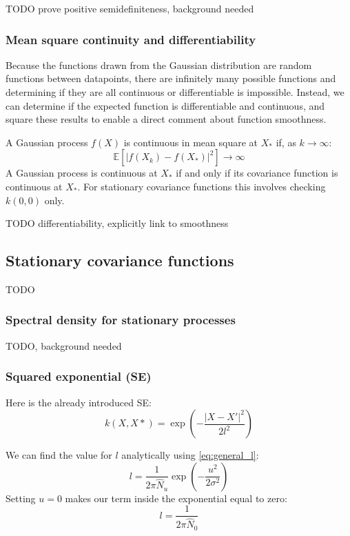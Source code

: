 \documentclass[10pt]{article}
\begin{document}
TODO prove positive semidefiniteness, background needed

\subsubsection{Mean square continuity and differentiability}
Because the functions drawn from the Gaussian distribution are random functions between datapoints, there are infinitely many possible functions and determining if they are all continuous or differentiable is impossible. Instead, we can determine if the expected function is differentiable and continuous, and square these results to enable a direct comment about function smoothness.

A Gaussian process $f(X)$ is continuous in mean square at $X_*$ if, as $k \to \infty$:
\begin{equation*}
    \mathbb{E}[|f(X_k) - f(X_*)|^2] \to \infty
\end{equation*}
A Gaussian process is continuous at $X_*$ if and only if its covariance function is continuous at $X_*$. For stationary covariance functions this involves checking $k(0, 0)$ only.

TODO differentiability, explicitly link to smoothness


\subsection{Stationary covariance functions \cite{gp-ml}}
TODO

\subsubsection{Spectral density for stationary processes}
TODO, background needed

\subsubsection{Squared exponential (SE)}
Here is the already introduced SE:
\begin{equation*}
    k(X,X*) = \exp \left(- \frac{|X - X'|^2}{2l^2} \right)
\end{equation*}

We can find the value for $l$ analytically using \ref{eq:general_l}:
\begin{equation*}
    l = \frac{1}{2\pi\hat{N}_u} \exp\left(-\frac{u^2}{2\sigma^2}\right)
\end{equation*}
Setting $u = 0$ makes our term inside the exponential equal to zero:
\begin{equation*}
    l = \frac{1}{2\pi\hat{N}_0}
\end{equation*}
\end{document}
